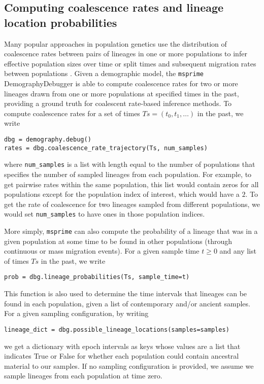 \documentclass{article}
\begin{document}
\subsection*{Computing coalescence rates and lineage location probabilities}
Many popular approaches in population genetics use the distribution of coalescence rates between
pairs of lineages in one or more populations to infer effective population sizes over time
\cite{li2011inference,sheehan2013estimating,schiffels2014inferring}
or split times
and subsequent migration rates between populations
\cite{wang2020tracking}.
Given a demographic model, the
\texttt{msprime} DemographyDebugger is able to compute coalescence rates for two or more lineages drawn
from one or more populations at specified times in the past, providing a ground truth for coalescent rate-based
inference methods. To compute coalescence rates for a set of times $Ts=(t_0, t_1, \ldots)$ in the
past, we write
\begin{lstlisting}[frame=single]
dbg = demography.debug()
rates = dbg.coalescence_rate_trajectory(Ts, num_samples)
\end{lstlisting}
where \texttt{num\_samples} is a list with length equal to the number of populations that
specifies the number of sampled lineages from each population. For example,
to get pairwise rates within the same
population, this list would contain zeros for all populations except for the population index of interest,
which would have a $2$. To get the rate of coalescence for two lineages sampled from different
populations, we would set \texttt{num\_samples} to have ones in those population indices.

More simply, \texttt{msprime} can also compute the probability of a lineage that was in a given
population at some time to be found in other populations (through continuous or mass migration events).
For a given sample time $t\geq0$ and any list of times $Ts$ in the past, we write
\begin{lstlisting}[frame=single]
prob = dbg.lineage_probabilities(Ts, sample_time=t)
\end{lstlisting}
This function is also used to determine the time intervals that lineages can be found in each population,
given a list of contemporary and/or ancient samples. For a given sampling configuration, by writing
\begin{lstlisting}[frame=single]
lineage_dict = dbg.possible_lineage_locations(samples=samples)
\end{lstlisting}
we get a dictionary with epoch intervals as keys whose values are a list that indicates True or False for
whether each population could contain ancestral material to our samples.
If no sampling configuration is provided, we assume we sample lineages from each population at time zero.
\end{document}
